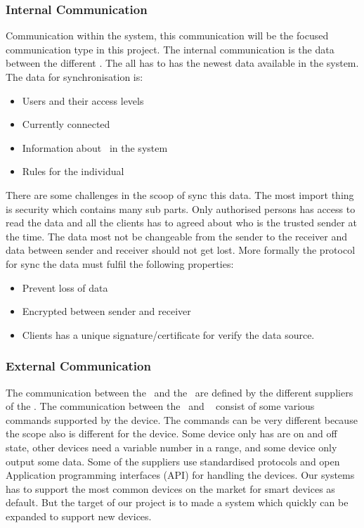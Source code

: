 \subsubsection{Internal Communication}
Communication within the system, this communication will be the focused communication type in this project. The internal communication is the data between the different \sdevs. The \sdevs all has to has the newest data available in the system. The data for synchronisation is:
\begin{itemize}
\item Users and their access levels
\item Currently connected \phones
\item Information about \sdevs~in the system
\item Rules for the individual \sdevs
\end{itemize}
There are some challenges in the scoop of sync this data. The most import thing is security which contains many sub parts. Only authorised persons has access to read the data and all the clients has to agreed about who is the trusted sender at the time. The data most not be changeable from the sender to the receiver and data between sender and receiver should not get lost. More formally the protocol for sync the data must fulfil the following properties:
\begin{itemize}
\item Prevent loss of data
\item Encrypted between sender and receiver
\item Clients has a unique signature/certificate for verify the data source.
\end{itemize}


\subsubsection{External Communication}
The communication between the \sdevs~and the \phones~are defined by the different suppliers of the \sdevs. The communication between the \sdevs~and \phones~  consist of some various commands supported by the device. The commands can be very different because the scope also is different for the device. Some device only has are on and off state, other devices need a variable number in a range, and some device only output some data. Some of the suppliers use standardised protocols and open Application programming interfaces (API) for handling the devices. Our systems has to support the most common devices on the market for smart devices as default. But the target of our project is to made a system which quickly can be expanded to support new devices. 

